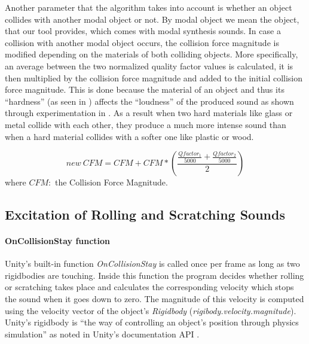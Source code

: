 Another parameter that the algorithm takes into account is whether an object collides with another modal object or not. By modal object we mean the object, that our tool provides, which comes with modal synthesis sounds. In case a collision with another modal object occurs, the collision force magnitude is modified depending on the materials of both colliding objects. More specifically, an average between the two normalized quality factor values is calculated, it is then multiplied by the collision force magnitude and added to the initial collision force magnitude. This is done because the material of an object and thus its ``hardness'' (as seen in \cite{giordano2003material}) affects the ``loudness'' of the produced sound as shown through experimentation in \cite{freed1990auditory}. As a result when two hard materials like glass or metal collide with each other, they produce a much more intense sound than when a hard material collides with a softer one like plastic or wood.  

\begin{equation}
new\ CFM = CFM + CFM*\left( \frac{\frac{Qfactor_1}{5000} + \frac{Qfactor_2}{5000}}{2} \right)
\end{equation} 
\noindent where $CFM:$ the Collision Force Magnitude.


\subsection{Excitation of Rolling and Scratching Sounds}
\paragraph{OnCollisionStay function}
\hfill \break

Unity\textsuperscript{\textregistered}'s built-in function \textit{OnCollisionStay} \cite{bib:unity_doc} is called once per frame as long as two rigidbodies are touching. Inside this function the program decides whether rolling or scratching takes place and calculates the corresponding velocity which stops the sound when it goes down to zero. The magnitude of this velocity is computed using the velocity vector of the object's \textit{Rigidbody} (\textit{rigibody.velocity.magnitude}). Unity\textsuperscript{\textregistered}'s rigidbody is ``the way of controlling an object's position through physics simulation'' as noted in Unity\textsuperscript{\textregistered}'s documentation API \cite{bib:unity_doc}.

